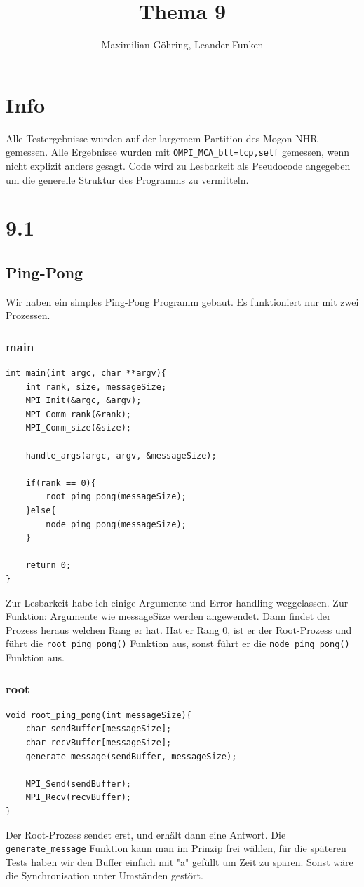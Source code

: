 \documentclass{report}
\title{Thema 9}
\author{Maximilian Göhring, Leander Funken}
\begin{document}
\maketitle

\section*{Info}
Alle Testergebnisse wurden auf der largemem Partition des Mogon-NHR gemessen.
\newline
Alle Ergebnisse wurden mit \verb|OMPI_MCA_btl=tcp,self| gemessen, wenn nicht 
explizit anders gesagt.
\newline
Code wird zu Lesbarkeit als Pseudocode angegeben um die generelle Struktur des 
Programms zu vermitteln. 
\newpage
\section*{9.1}
\subsection*{Ping-Pong}
Wir haben ein simples Ping-Pong Programm gebaut. Es funktioniert nur mit zwei 
Prozessen.
\subsubsection*{main}
\begin{lstlisting}
int main(int argc, char **argv){
    int rank, size, messageSize;
    MPI_Init(&argc, &argv);
    MPI_Comm_rank(&rank);
    MPI_Comm_size(&size);

    handle_args(argc, argv, &messageSize);

    if(rank == 0){
        root_ping_pong(messageSize);
    }else{
        node_ping_pong(messageSize);
    }

    return 0;
}
\end{lstlisting}
Zur Lesbarkeit habe ich einige Argumente und Error-handling weggelassen.
Zur Funktion:
Argumente wie messageSize werden angewendet. Dann findet der Prozess heraus 
welchen Rang er hat. Hat er Rang 0, ist er der Root-Prozess
und führt die \verb|root_ping_pong()| Funktion aus, sonst führt er die
\verb|node_ping_pong()| Funktion aus.
\subsubsection*{root}
\begin{lstlisting}
void root_ping_pong(int messageSize){
    char sendBuffer[messageSize];
    char recvBuffer[messageSize];
    generate_message(sendBuffer, messageSize);

    MPI_Send(sendBuffer);
    MPI_Recv(recvBuffer);
}
\end{lstlisting}
Der Root-Prozess sendet erst, und erhält dann eine Antwort. Die 
\verb|generate_message| Funktion
kann man im Prinzip frei wählen, für die späteren Tests haben wir den Buffer 
einfach mit "a" gefüllt um Zeit zu sparen.
Sonst wäre die Synchronisation unter Umständen gestört.
\end{document}
